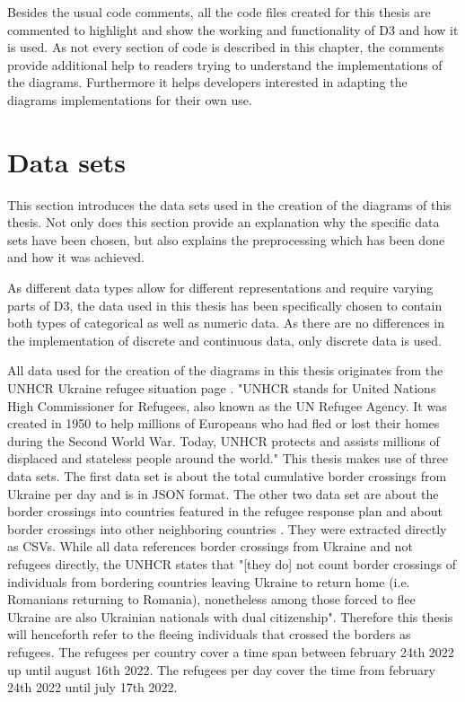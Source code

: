 Besides the usual code comments, all the code files created for this thesis are commented to highlight and show the working and functionality of D3 and how it is used. As not every section of code is described in this chapter, the comments provide additional help to readers trying to understand the implementations of the diagrams. Furthermore it helps developers interested in adapting the diagrams implementations for their own use.

\section{Data sets}\label{sec:data-sets}
This section introduces the data sets used in the creation of the diagrams of this thesis. Not only does this section provide an explanation why the specific data sets have been chosen, but also explains the preprocessing which has been done and how it was achieved.

As different data types allow for different representations and require varying parts of D3, the data used in this thesis has been specifically chosen to contain both types of categorical as well as numeric data. As there are no differences in the implementation of discrete and continuous data, only discrete data is used.

All data used for the creation of the diagrams in this thesis originates from the UNHCR Ukraine refugee situation page \cite{unhcr}. "UNHCR stands for United Nations High Commissioner for Refugees, also known as the UN Refugee Agency. It was created in 1950 to help millions of Europeans who had fled or lost their homes during the Second World War. Today, UNHCR protects and assists millions of displaced and stateless people around the world."\cite{unhcr_what}
This thesis makes use of three data sets. The first data set is about the total cumulative border crossings from Ukraine per day \cite{unhcr_rpd} and is in JSON format. The other two data set are about the border crossings into countries featured in the refugee response plan and about border crossings into other neighboring countries \cite{unhcr}. They were extracted directly as CSVs. While all data references border crossings from Ukraine and not refugees directly, the UNHCR states that "[they do] not count border crossings of individuals from bordering countries leaving Ukraine to return home (i.e. Romanians returning to Romania), nonetheless among those forced to flee Ukraine are also Ukrainian nationals with dual citizenship"\cite{unhcr_note}. Therefore this thesis will henceforth refer to the fleeing individuals that crossed the borders as refugees.
The refugees per country cover a time span between february 24th 2022 up until august 16th 2022\cite{unhcr}. The refugees per day cover the time from february 24th 2022 until july 17th 2022\cite{unhcr_rpd}.

